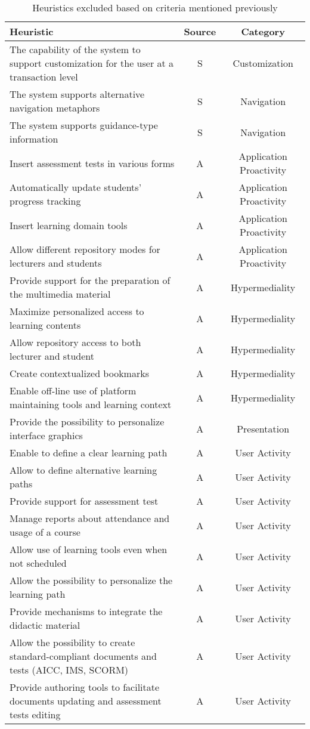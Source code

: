 \begin{table}[htbp]
	\centering
	\caption{Heuristics excluded based on criteria mentioned previously}
	\label{tab:excluded}
	\begin{tabularx}{\textwidth}{Xcc}	\toprule
		\textbf{Heuristic} & \textbf{Source} & \textbf{Category} \\ \midrule
		The capability of the system to support customization for the user at a transaction level & S & Customization \\
		The system supports alternative navigation metaphors & S & Navigation \\
		The system supports guidance-type information & S & Navigation \\
		Insert assessment tests in various forms & A & Application Proactivity \\
		Automatically update students' progress tracking & A & Application Proactivity \\
		Insert learning domain tools & A & Application Proactivity \\
		Allow different repository modes for lecturers and students & A & Application Proactivity \\
		Provide support for the preparation of the multimedia material & A & Hypermediality \\
		Maximize personalized access to learning contents & A & Hypermediality \\
		Allow repository access to both lecturer and student & A & Hypermediality \\
		Create contextualized bookmarks & A & Hypermediality \\
		Enable off-line use of platform maintaining tools and learning context & A & Hypermediality \\
		Provide the possibility to personalize interface graphics & A & Presentation \\
		Enable to define a clear learning path & A & User Activity \\
		Allow to define alternative learning paths & A & User Activity \\
		Provide support for assessment test & A & User Activity \\
		Manage reports about attendance and usage of a course & A & User Activity \\
		Allow use of learning tools even when not scheduled & A & User Activity \\
		Allow the possibility to personalize the learning path & A & User Activity \\
		Provide mechanisms to integrate the didactic material & A & User Activity \\
		Allow the possibility to create standard-com\-pliant documents and tests (AICC, IMS, SC\-O\-R\-M) & A & User Activity \\
		Provide authoring tools to facilitate documents updating and assessment tests editing & A & User Activity \\
		\bottomrule
	\end{tabularx}
\end{table}

